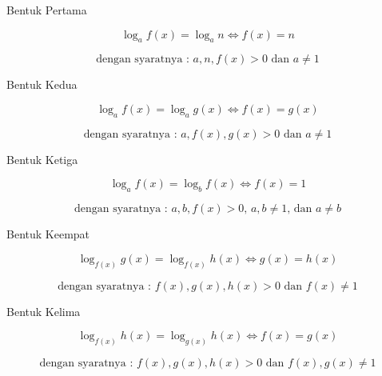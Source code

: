 \begin{eulernotebook}
\begin{eulercomment}
\begin{eulercomment}
\begin{eulercomment}
Bentuk Pertama\\
\end{eulercomment}
\begin{eulerformula}
\[
\log_{a} f(x) = \log_{a} n \Leftrightarrow f(x)=n
\]
\end{eulerformula}
\begin{eulerformula}
\[
\text{dengan syaratnya : } a,n,f(x)>0 \text{ dan } a \neq 1
\]
\end{eulerformula}
\begin{eulercomment}
Bentuk Kedua\\
\end{eulercomment}
\begin{eulerformula}
\[
\log_{a} f(x) = \log_{a} g(x) \Leftrightarrow f(x)=g(x)
\]
\end{eulerformula}
\begin{eulerformula}
\[
\text{dengan syaratnya : } a,f(x),g(x)>0 \text{ dan } a \neq 1
\]
\end{eulerformula}
\begin{eulercomment}
Bentuk Ketiga\\
\end{eulercomment}
\begin{eulerformula}
\[
\log_{a} f(x) = \log_{b} f(x) \Leftrightarrow f(x)=1
\]
\end{eulerformula}
\begin{eulerformula}
\[
\text{dengan syaratnya : } a,b,f(x)>0 \text{, } a,b \neq 1 \text{, dan } a \neq b
\]
\end{eulerformula}
\begin{eulercomment}
Bentuk Keempat\\
\end{eulercomment}
\begin{eulerformula}
\[
\log_{f(x)} g(x) = \log_{f(x)} h(x) \Leftrightarrow g(x)=h(x)
\]
\end{eulerformula}
\begin{eulerformula}
\[
\text{dengan syaratnya : } f(x),g(x),h(x)>0 \text{ dan } f(x) \neq 1
\]
\end{eulerformula}
\begin{eulercomment}
Bentuk Kelima\\
\end{eulercomment}
\begin{eulerformula}
\[
\log_{f(x)} h(x) = \log_{g(x)} h(x) \Leftrightarrow f(x)=g(x)
\]
\end{eulerformula}
\begin{eulerformula}
\[
\text{dengan syaratnya : } f(x),g(x),h(x)>0 \text{ dan } f(x),g(x) \neq 1
\]
\end{eulerformula}
\end{eulercomment}
\end{eulercomment}
\end{eulernotebook}
